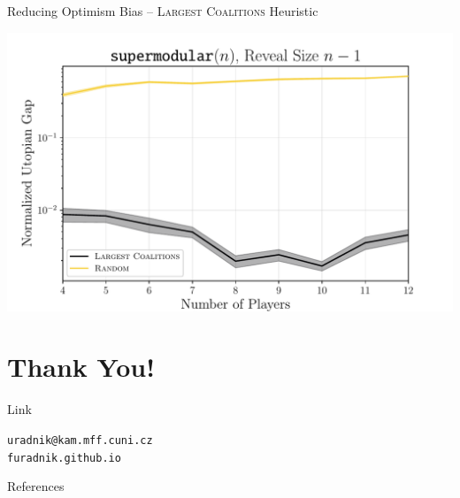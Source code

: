 \documentclass[aspectratio=169]{beamer}
\begin{document}
\begin{frame}{Reducing Optimism Bias -- \textsc{Largest Coalitions} Heuristic}
	\begin{center}
		\includegraphics[width=.8\textwidth]{figures/convex_linear.pdf}
	\end{center}
\end{frame}

\section{Thank You!}

\appendix

\begin{frame}{Link}
	\begin{center}

		\vspace{3em}
\texttt{uradnik@kam.mff.cuni.cz}
\\
\texttt{furadnik.github.io}
	\end{center}
	
\end{frame}

\begin{frame}[allowframebreaks]{References}
    \nocite{*}
    \printbibliography[heading=none]
\end{frame}
\end{document}
